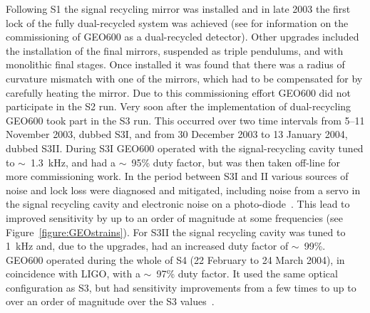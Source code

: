 \documentclass{article}
\begin{document}

Following S1 the signal recycling mirror was installed and in late 2003 the
first lock of the fully dual-recycled system was achieved (see
\cite{Smith:2004, Willke:2004, Grote:2005} for information on the commissioning
of GEO600 as a dual-recycled detector). Other upgrades included the
installation of the final mirrors, suspended as triple pendulums, and with
monolithic final stages. Once installed it was found that there was a radius of
curvature mismatch with one of the mirrors, which had to be compensated for by
carefully heating the mirror. Due to this commissioning effort GEO600 did not
participate in the S2 run. Very soon after the implementation of dual-recycling
GEO600 took part in the S3 run. This occurred over two time intervals from
5--11 November 2003, dubbed S3I, and from 30 December 2003 to 13 January 2004,
dubbed S3II. During S3I GEO600 operated with the signal-recycling cavity tuned
to $\sim$~1.3~kHz, and had a $\sim$~95\% duty factor, but was then taken
off-line for more commissioning work. In the period between S3I and II various
sources of noise and lock loss were diagnosed and mitigated, including noise
from a servo in the signal recycling cavity and electronic noise on a
photo-diode~\cite{Smith:2004}. This lead to improved sensitivity by up to an
order of magnitude at some frequencies (see Figure~\ref{figure:GEOstrains}). For
S3II the signal recycling cavity was tuned to 1~kHz and, due to the upgrades,
had an increased duty factor of $\sim$~99\%. GEO600 operated during the whole of
S4 (22 February to 24 March 2004), in coincidence with LIGO, with a $\sim$~97\%
duty factor. It used the same optical configuration as S3, but had sensitivity
improvements from a few times to up to over an order of magnitude over the S3
values~\cite{Hild:2006a}.
\end{document}

